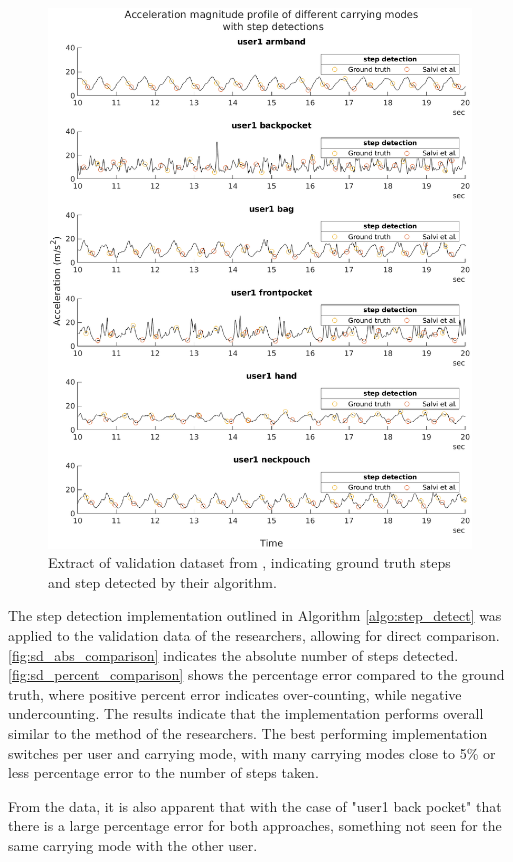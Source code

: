 \begin{figure}[H]
	\centering
	\includegraphics[width=\linewidth]{images/20201112_1318_gt_steps_vs_salvi_steps_1}
	\caption[Step detection validation data]{Extract of validation dataset from \citet{Salvi2018}, indicating ground truth steps and step detected by their algorithm.}
	\label{fig:gt_steps_vs_salvi_steps}
\end{figure}

\newpage
The step detection implementation outlined in Algorithm \ref{algo:step_detect} was applied to the validation data of the researchers, allowing for direct comparison. \cref{fig:sd_abs_comparison} indicates the absolute number of steps detected. \cref{fig:sd_percent_comparison}  shows the percentage error compared to the ground truth, where positive percent error indicates over-counting, while negative undercounting. The results indicate that the implementation performs overall similar to the method of the researchers.  The best performing implementation switches per user and carrying mode, with many carrying modes close to 5\% or less percentage error to the number of steps taken. \par 
From the data, it is also apparent that with the case of "user1 back pocket" that there is a large percentage error for both approaches, something not seen for the same carrying mode with the other user. 
 
